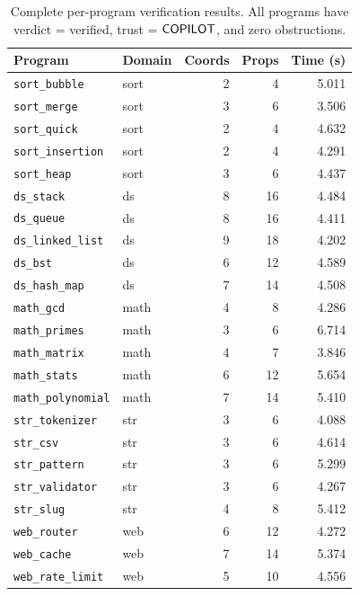 \documentclass[11pt]{article}
\begin{document}
\begin{table}[H]
\centering
\caption{Complete per-program verification results.  All programs
  have verdict = verified, trust = $\mathsf{COPILOT}$, and zero
  obstructions.}\label{tab:per-program}
\small
\begin{tabular}{@{}l l r r r@{}}
\toprule
\textbf{Program} & \textbf{Domain} & \textbf{Coords}
  & \textbf{Props} & \textbf{Time (s)} \\
\midrule
\texttt{sort\_bubble}      & sort & 2  & 4  & 5.011 \\
\texttt{sort\_merge}       & sort & 3  & 6  & 3.506 \\
\texttt{sort\_quick}       & sort & 2  & 4  & 4.632 \\
\texttt{sort\_insertion}   & sort & 2  & 4  & 4.291 \\
\texttt{sort\_heap}        & sort & 3  & 6  & 4.437 \\
\midrule
\texttt{ds\_stack}         & ds   & 8  & 16 & 4.484 \\
\texttt{ds\_queue}         & ds   & 8  & 16 & 4.411 \\
\texttt{ds\_linked\_list}  & ds   & 9  & 18 & 4.202 \\
\texttt{ds\_bst}           & ds   & 6  & 12 & 4.589 \\
\texttt{ds\_hash\_map}     & ds   & 7  & 14 & 4.508 \\
\midrule
\texttt{math\_gcd}         & math & 4  & 8  & 4.286 \\
\texttt{math\_primes}      & math & 3  & 6  & 6.714 \\
\texttt{math\_matrix}      & math & 4  & 7  & 3.846 \\
\texttt{math\_stats}       & math & 6  & 12 & 5.654 \\
\texttt{math\_polynomial}  & math & 7  & 14 & 5.410 \\
\midrule
\texttt{str\_tokenizer}    & str  & 3  & 6  & 4.088 \\
\texttt{str\_csv}          & str  & 3  & 6  & 4.614 \\
\texttt{str\_pattern}      & str  & 3  & 6  & 5.299 \\
\texttt{str\_validator}    & str  & 3  & 6  & 4.267 \\
\texttt{str\_slug}         & str  & 4  & 8  & 5.412 \\
\midrule
\texttt{web\_router}       & web  & 6  & 12 & 4.272 \\
\texttt{web\_cache}        & web  & 7  & 14 & 5.374 \\
\texttt{web\_rate\_limit}  & web  & 5  & 10 & 4.556 \\

\end{tabular}
\end{table}
\end{document}
